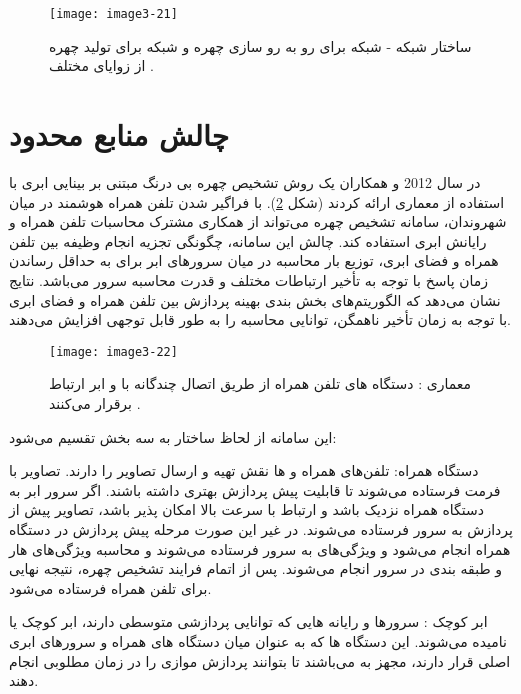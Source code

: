 \begin{figure}[h]
\centering
  \texttt{[image: image3-21]}
  \caption{ساختار شبکه  - شبکه  برای رو به رو سازی چهره و شبکه  برای تولید چهره از زوایای مختلف \cite{8603840}.}
  \label{image3-21}
\end{figure}
 
\section{چالش منابع محدود}
در سال 2012  و همکاران \cite{6249269} یک روش تشخیص چهره بی درنگ مبتنی بر بینایی ابری  با استفاده از معماری   ارائه کردند (شکل \ref{image3-22}). با فراگیر شدن تلفن همراه هوشمند در میان شهروندان، سامانه تشخیص چهره می‌تواند از همکاری مشترک محاسبات تلفن همراه و رایانش ابری استفاده کند. چالش این سامانه، چگونگی تجزیه انجام وظیفه بین تلفن همراه و فضای ابری، توزیع بار محاسبه در میان سرورهای ابر برای به حداقل رساندن زمان پاسخ با توجه به تأخیر ارتباطات مختلف و قدرت محاسبه سرور می‌باشد. نتایج نشان می‌دهد که الگوریتم‌های بخش بندی بهینه پردازش بین تلفن همراه و فضای ابری با توجه به زمان تأخیر ناهمگن، توانایی محاسبه را به طور قابل توجهی افزایش می‌دهند. 

\begin{figure}[h]
\centering
  \texttt{[image: image3-22]}
  \caption{معماری : دستگاه های تلفن همراه از طریق اتصال چندگانه با  و ابر ارتباط برقرار می‌کنند \cite{6249269}.}
  \label{image3-22}
\end{figure}

\noindent
این سامانه از لحاظ ساختار به سه بخش تقسیم می‌شود:

\noindent
دستگاه همراه: تلفن‌های همراه و  ها نقش تهیه و ارسال تصاویر را دارند. تصاویر با فرمت  فرستاده می‌شوند تا قابلیت پیش پردازش بهتری داشته باشند. اگر سرور ابر به دستگاه همراه نزدیک باشد و ارتباط با سرعت بالا امکان پذیر باشد، تصاویر پیش از پردازش به سرور فرستاده می‌شوند. در غیر این صورت مرحله پیش پردازش در دستگاه همراه انجام می‌شود و ویژگی‌های  به سرور فرستاده می‌شوند و محاسبه ویژگی‌های هار و طبقه بندی در سرور انجام می‌شوند. پس از اتمام فرایند تشخیص چهره، نتیجه نهایی برای تلفن همراه فرستاده می‌شود.

\noindent
ابر کوچک : سرورها و رایانه هایی که توانایی پردازشی متوسطی دارند، ابر کوچک یا  نامیده می‌شوند. این دستگاه ها که به عنوان میان دستگاه های همراه و سرورهای ابری اصلی قرار دارند، مجهز به  می‌باشند تا بتوانند پردازش موازی را در زمان مطلوبی انجام دهند.

